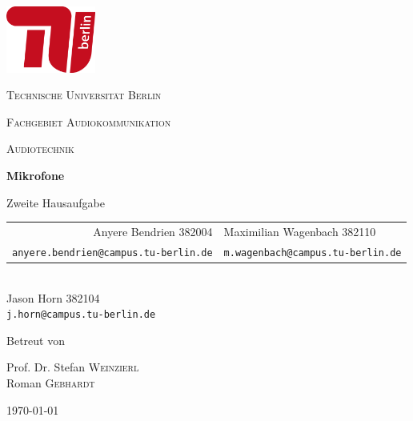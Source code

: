 \begin{titlepage}
    \centering
    \includegraphics[height=62pt]{tu_red.png}\par
    {\scshape\huge Technische Universität Berlin \par}
    {\scshape\Large Fachgebiet Audiokommunikation\par}
    \vspace{1.5cm}
    {\scshape\LARGE Audiotechnik\par}
    \vspace{1.5cm}

    {\Huge\bfseries {Mikrofone}\par}
    \vspace{0.1cm}
    {\large Zweite Hausaufgabe\par}
    \vspace{1cm}

    {\itshape
        \begin{tabular}{rl}
          Anyere Bendrien 382004 &
          Maximilian Wagenbach 382110 \\
          \vspace{0.2cm}
          \small \texttt{anyere.bendrien@campus.tu-berlin.de} &
          \small \texttt{m.wagenbach@campus.tu-berlin.de}
        \end{tabular}\\
        Jason Horn 382104 \\
        \small \texttt{j.horn@campus.tu-berlin.de} 
    }
    \vfill
    
    Betreut von\par
    Prof. Dr. Stefan \textsc{Weinzierl} \\
    Roman \textsc{Gebhardt}
    \vspace{1cm}
    
    {\large \today\par}
\end{titlepage}